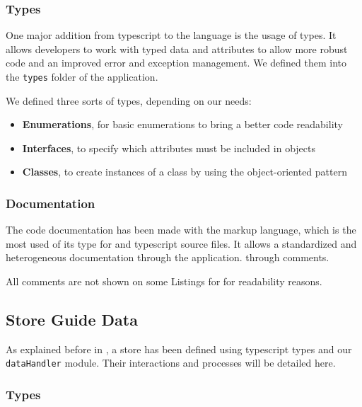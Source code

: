 \subsubsection{Types}
\label{subsubsec:app_implementation_basics_types}

One major addition from \gls{typescript} to the  language is the usage of types. It allows developers to work with typed data and attributes to allow more robust code and an improved error and exception management. We defined them into the \texttt{types} folder of the application.

We defined three sorts of types, depending on our needs:
\begin{itemize}
	\item \textbf{Enumerations}, for basic enumerations to bring a better code readability
	\item \textbf{Interfaces}, to specify which attributes must be included in  objects
	\item \textbf{Classes}, to create instances of a class by using the object-oriented pattern
\end{itemize}

\subsubsection{Documentation}
\label{subsubsec:app_implementation_basics_documentation}

The code documentation has been made with the  markup language, which is the most used of its type for  and \gls{typescript} source files. It allows a standardized and heterogeneous documentation through the application. through comments.

All comments are not shown on some Listings for for readability reasons.

\subsection{Store Guide Data}
\label{subsec:app_implementation_store}

As explained before in , a  store has been defined using \gls{typescript} types and our  \texttt{dataHandler} module. Their interactions and processes will be detailed here.

\subsubsection{Types}
\label{subsubsec:app_implementation_store_types}

